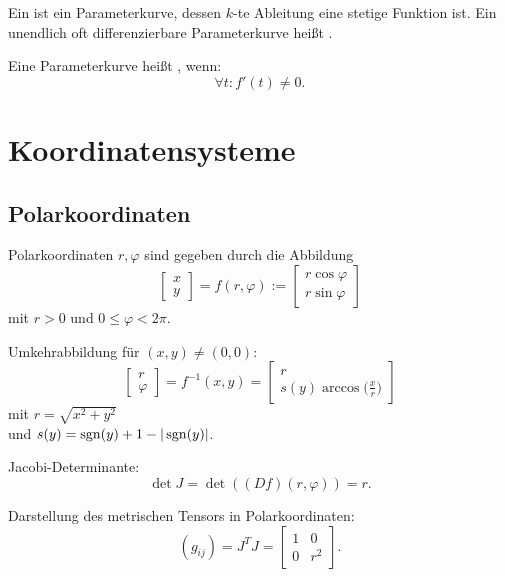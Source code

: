 Ein  ist ein Parameterkurve, dessen $k$-te Ableitung
eine stetige Funktion ist. Ein unendlich oft differenzierbare
Parameterkurve heißt .

Eine Parameterkurve heißt , wenn:
\begin{equation}
\forall t\colon f'(t)\ne 0.
\end{equation}

\section{Koordinatensysteme}
\subsection{Polarkoordinaten}
Polarkoordinaten $r,\varphi$ sind gegeben durch
die Abbildung
\begin{equation}
\begin{bmatrix}x\\ y\end{bmatrix}
=f(r,\varphi)
:=\begin{bmatrix}
r\cos\varphi\\
r\sin\varphi
\end{bmatrix}
\end{equation}
mit $r>0$ und $0\le\varphi<2\pi$.

Umkehrabbildung für $(x,y)\ne (0,0)$:
\begin{equation}
\begin{bmatrix}r\\ \varphi\end{bmatrix}
= f^{-1}(x,y)
= \begin{bmatrix}
r\\
\displaystyle s(y)\arccos\Big(\frac{x}{r}\Big)
\end{bmatrix}
\end{equation}
mit $r=\sqrt{x^2+y^2}$\\
und $s(y)=\operatorname*{sgn}(y)+1-|\operatorname*{sgn}(y)|$.

Jacobi-Determinante:
\begin{equation}
\det J = \det((Df)(r,\varphi)) =r.
\end{equation}

\pagebreak[3]\noindent
Darstellung des metrischen Tensors in Polarkoordinaten:%
\begin{equation}
(g_{ij}) = J^T J = \begin{bmatrix}
1 & 0\\
0 & r^2
\end{bmatrix}.
\end{equation}


